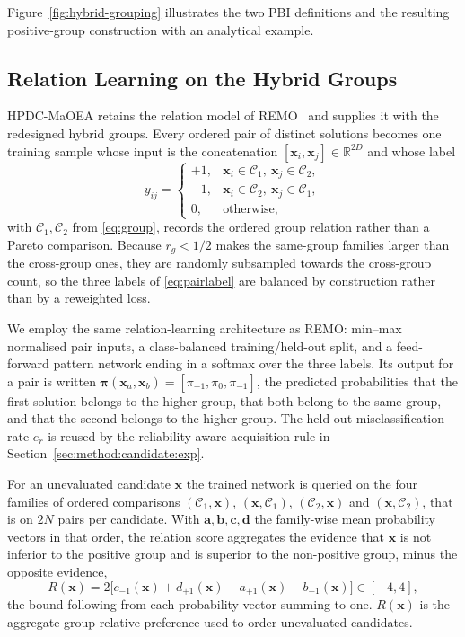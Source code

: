 \documentclass[final,5p,times,twocolumn]{elsarticle}
\newcommand{\vx}{\mathbf{x}}
\begin{document}
Figure~\ref{fig:hybrid-grouping} illustrates the two PBI definitions and the
resulting positive-group construction with an analytical example.


\subsection{Relation Learning on the Hybrid Groups}
\label{sec:method:relation}

HPDC-MaOEA retains the relation model of REMO~\cite{ref:remo} and supplies it
with the redesigned hybrid groups. Every ordered pair
of distinct solutions becomes one training sample whose input is the
concatenation $[\vx_i,\vx_j]\in\mathbb{R}^{2D}$ and whose label
\begin{equation}
y_{ij}=
\begin{cases}
+1, & \vx_i\in\mathcal{C}_1,\ \vx_j\in\mathcal{C}_2,\\
-1, & \vx_i\in\mathcal{C}_2,\ \vx_j\in\mathcal{C}_1,\\
0,  & \text{otherwise},
\end{cases}
\label{eq:pairlabel}
\end{equation}
with $\mathcal{C}_1,\mathcal{C}_2$ from \eqref{eq:group}, records the ordered
group relation rather than a Pareto comparison. Because $r_g<1/2$ makes the
same-group families larger than the cross-group ones, they are randomly
subsampled towards the cross-group count, so the three labels of
\eqref{eq:pairlabel} are balanced by construction rather than by a reweighted
loss.

We employ the same relation-learning architecture as REMO: min--max normalised
pair inputs, a class-balanced training/held-out split, and a feed-forward pattern
network ending in a softmax over the three labels.
Its output for a pair is written
$\bm{\pi}(\vx_a,\vx_b)=[\pi_{+1},\pi_0,\pi_{-1}]$, the predicted probabilities
that the first solution belongs to the higher group, that both belong to the
same group, and that the second belongs to the higher group. The held-out
misclassification rate $e_r$ is reused by the reliability-aware acquisition
rule in Section~\ref{sec:method:candidate:exp}.

For an unevaluated candidate $\vx$ the trained network is queried on the four
families of ordered comparisons $(\mathcal{C}_1,\vx)$, $(\vx,\mathcal{C}_1)$,
$(\mathcal{C}_2,\vx)$ and $(\vx,\mathcal{C}_2)$, that is on $2N$ pairs per
candidate. With $\mathbf{a},\mathbf{b},\mathbf{c},\mathbf{d}$ the family-wise
mean probability vectors in that order, the relation score aggregates the
evidence that $\vx$ is not inferior to the positive group and is superior to the
non-positive group, minus the opposite evidence,
\begin{equation}
R(\vx)=2\bigl[c_{-1}(\vx)+d_{+1}(\vx)-a_{+1}(\vx)-b_{-1}(\vx)\bigr]
\in[-4,4],
\label{eq:relscore}
\end{equation}
the bound following from each probability vector summing to one. $R(\vx)$ is the
aggregate group-relative preference used to order unevaluated candidates.
\end{document}
